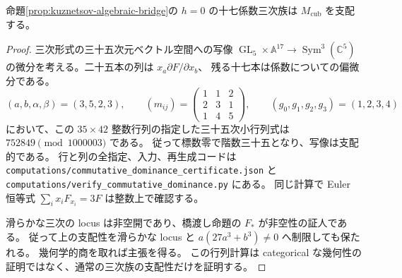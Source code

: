 \begin{lemma}[通常の三次族の支配性]
\label{lem:kuznetsov-classical-dominance}
命題\ref{prop:kuznetsov-algebraic-bridge}の $h=0$ の十七係数三次族は
$M_{\mathrm{cub}}$ を支配する。
\end{lemma}
\begin{proof}
三次形式の三十五次元ベクトル空間への写像
$\operatorname{GL}_5\times\mathbb A^{17}\to\operatorname{Sym}^3(\mathbb C^5)$
の微分を考える。二十五本の列は $x_a\partial F/\partial x_b$、
残る十七本は係数についての偏微分である。
\[
 (a,b,\alpha,\beta)=(3,5,2,3),\qquad
 (m_{ij})=\begin{pmatrix}1&1&2\\2&3&1\\1&4&5\end{pmatrix},
 \qquad(g_0,g_1,g_2,g_3)=(1,2,3,4)
\]
において、この $35\times42$ 整数行列の指定した三十五次小行列式は
$752849\pmod{1000003}$ である。
従って標数零で階数三十五となり、写像は支配的である。
行と列の全指定、入力、再生成コードは
\texttt{computations/commutative\_dominance\_certificate.json} と
\texttt{computations/verify\_commutative\_dominance.py} にある。
同じ計算で Euler 恒等式 $\sum_i x_iF_{x_i}=3F$ は整数上で確認する。

滑らかな三次の locus は非空開であり、橋渡し命題の $F_*$ が非空性の証人である。
従って上の支配性を滑らかな locus と $a(27a^3+b^3)\ne0$ へ制限しても保たれる。
幾何学的商を取れば主張を得る。
この行列計算は categorical な幾何性の証明ではなく、通常の三次族の支配性だけを証明する。
\end{proof}

